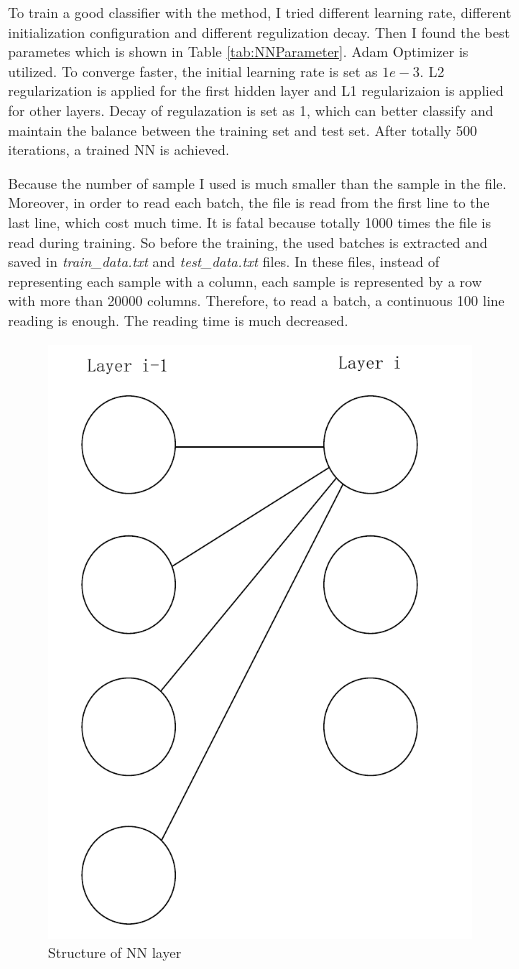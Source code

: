 \documentclass[sigchi]{acmart}
\begin{document}
To train a good classifier with the method, I tried different learning rate, different initialization configuration and different regulization decay. Then I found the best parametes which is shown in Table \ref{tab:NNParameter}. Adam Optimizer is utilized. To converge faster, the initial learning rate is set as $1e-3$. L2 regularization is applied for the first hidden layer and L1 regularizaion is applied for other layers. Decay of regulazation is set as 1, which can better classify and maintain the balance between the training set and test set. After totally 500 iterations, a trained NN is achieved.

Because the number of sample I used is much smaller than the sample in the file. Moreover, in order to read each batch, the file is read from the first line to the last line, which cost much time. It is fatal because totally 1000 times the file is read during training. So before the training, the used batches is extracted and saved in \textit{train\_data.txt} and \textit{test\_data.txt} files. In these files, instead of representing each sample with a column, each sample is represented by a row with more than 20000 columns. Therefore, to read a batch, a continuous 100 line reading is enough. The reading time is much decreased.


\begin{figure}
  \centering
  \includegraphics[width=0.5\linewidth]{figures/MLP.pdf}
  \caption{Structure of NN layer}
  \label{fig:MLP}
\end{figure}
\end{document}
